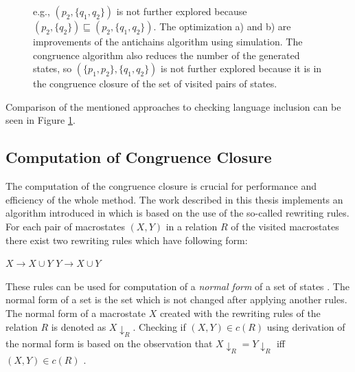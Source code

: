 \begin{figure}[th]
\begin{center}
{{      e.g., $(p_2,\{q_1,q_2\})$ is not further explored because $(p_2,\{q_2\}) \sqsubseteq (p_2,\{q_1,q_2\})$. 
      The optimization a) and b) are improvements of the antichains algorithm using simulation. 
      The congruence algorithm also reduces the number of the generated states, so $(\{p_1,p_2\},\{q_1,q_2\})$ 
      is not further explored because it is in the congruence closure 
      of the set of visited pairs of states.}}
  \label{automata}
\end{center}
\end{figure}
Comparison of the mentioned approaches to checking language inclusion can be seen in Figure \ref{automata}.

\subsection{Computation of Congruence Closure}
\label{subsectionCongr}
The computation of the congruence closure is crucial for performance and efficiency of the whole method. The work described in this thesis implements
an algorithm introduced in \cite{popl13} which is based on the use of the so-called rewriting rules. For each pair of macrostates $(X,Y)$ in 
a relation $R$ of the visited macrostates there exist two rewriting rules which have following form:
\begin{center}
$X\rightarrow X\cup Y$ \hspace{5cm} $Y\rightarrow X\cup Y$
\end{center}

These rules can be used for computation of a \emph{normal form} of a set of states \cite{popl13}. The normal form of a set is the
set which is not changed after applying another rules. The normal form of a macrostate $X$ created with
the rewriting rules of the relation $R$ is denoted as $X{\downarrow_R}$.
Checking if $(X,Y)\in c(R)$ using derivation of the normal form is based on the observation that $X{\downarrow_R}=Y{\downarrow_R}$ 
iff $(X,Y)\in c(R)$ \cite{popl13}.

